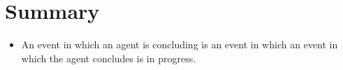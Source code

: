 \section*{Summary}
\label{sec:summary}


\begin{note}
  \begin{itemize}
  \item
    An event in which an agent is concluding is an event in which an event in which the agent concludes is in progress.
  \end{itemize}
\end{note}









